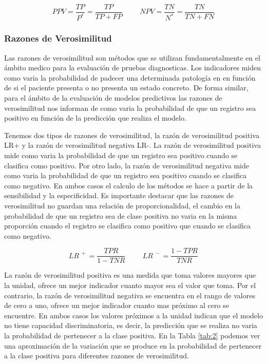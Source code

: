 \bigbreak
\begin{equation}\tag*{}
    PPV = \frac{TP}{P^{*}} = \frac{TP}{TP+FP}
    \hspace{1cm}
    NPV = \frac{TN}{N^{*}} = \frac{TN}{TN+FN}
\end{equation}


\subsubsection{Razones de Verosimilitud}

Las razones de verosimilitud son métodos que se utilizan fundamentalmente en el ámbito medico para la evaluación de pruebas diagnosticas. Los indicadores miden como varia la probabilidad de padecer una determinada patología en en función de si el paciente presenta o no presenta un estado concreto. De forma similar, para el ámbito de la evaluación de modelos predictivos las razones de verosimilitud nos informan de como varia la probabilidad de que un registro sea positivo en función de la predicción que realiza el modelo.

\bigbreak

Tenemos dos tipos de razones de verosimilitud, la razón de verosimilitud positiva LR+ y la razón de verosimilitud negativa LR-. La razón de verosimilitud positiva mide como varia la probabilidad de que un registro sea positivo cuando se clasifica como positivo. Por otro lado, la razón de verosimilitud negativa mide como varia la probabilidad de que un registro sea positivo cuando se clasifica como negativo. En ambos casos el calculo de los métodos se hace a partir de la sensibilidad y la especificidad. Es importante destacar que las razones de verosimilitud no guardan una relación de proporcionalidad, el cambio en la probabilidad de que un registro sea de clase positiva no varia en la misma proporción cuando el registro se clasifica como positivo que cuando se clasifica como negativo.

\bigbreak

\begin{equation}\tag*{}
    LR^{\phantom{.}+}    = \frac{TPR}{1-TNR}
    \hspace{1cm}
    LR^{\phantom{.}-} = \frac{1-TPR}{TNR}
\end{equation}

\bigbreak

La razón de verosimilitud positiva es una medida que toma valores mayores que la unidad, ofrece un mejor indicador cuanto mayor sea el valor que toma. Por el contrario, la razón de verosimilitud negativa se encuentra en el rango de valores de cero a uno, ofrece un mejor indicador cuanto mas próximo al cero se encuentre. En ambos casos los valores próximos a la unidad indican que el modelo no tiene capacidad discriminatoria, es decir, la predicción que se realiza no varia la probabilidad de pertenecer a la clase positiva. En la Tabla \ref{tab:2} podemos ver una aproximación de la variación que se produce en la probabilidad de pertenecer a la clase positiva para diferentes razones de verosimilitud.

